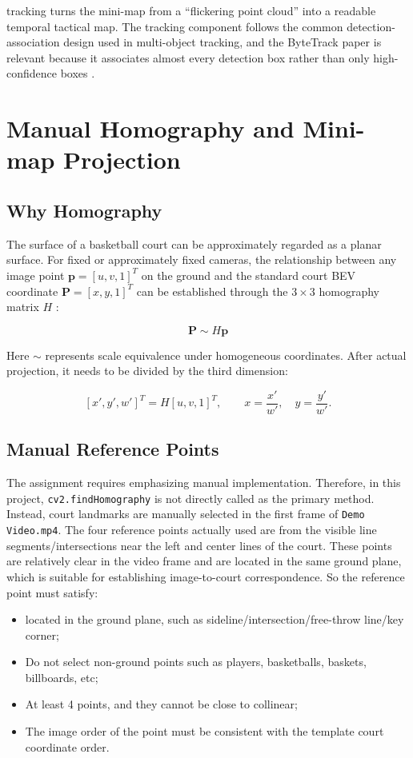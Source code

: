\documentclass[12pt,a4paper]{article}
\begin{document}
tracking turns the mini-map from a ``flickering point cloud'' into a readable temporal tactical map. The tracking component follows the common detection-association design used in multi-object tracking, and the ByteTrack paper is relevant because it associates almost every detection box rather than only high-confidence boxes \cite{zhang2022bytetrack}.

\section{Manual Homography and Mini-map Projection}

\subsection{Why Homography}

The surface of a basketball court can be approximately regarded as a planar surface. For fixed or approximately fixed cameras, the relationship between any image point $\mathbf{p} = [u, v, 1]^T$ on the ground and the standard court BEV coordinate $\mathbf{P} = [x, y, 1]^T$ can be established through the $3 \times 3$ homography matrix $H$ \cite{hartley2004multiple,opencv2026homography}:

\[
\mathbf{P} \sim H\mathbf{p}
\]

Here $\sim$ represents scale equivalence under homogeneous coordinates. After actual projection, it needs to be divided by the third dimension:

\[
[x', y', w']^T = H[u, v, 1]^T,
\qquad
x = \frac{x'}{w'}, \quad y = \frac{y'}{w'}.
\]

\subsection{Manual Reference Points}

The assignment requires emphasizing manual implementation. Therefore, in this project, \texttt{cv2.findHomography} is not directly called as the primary method. Instead, court landmarks are manually selected in the first frame of \texttt{Demo Video.mp4}. The four reference points actually used are from the visible line segments/intersections near the left and center lines of the court. These points are relatively clear in the video frame and are located in the same ground plane, which is suitable for establishing image-to-court correspondence. So the reference point must satisfy:

\begin{itemize}[leftmargin=1.8em]
    \item located in the ground plane, such as sideline/intersection/free-throw line/key corner;
    \item Do not select non-ground points such as players, basketballs, baskets, billboards, etc;
    \item At least 4 points, and they cannot be close to collinear;
    \item The image order of the point must be consistent with the template court coordinate order.
\end{itemize}
\end{document}
